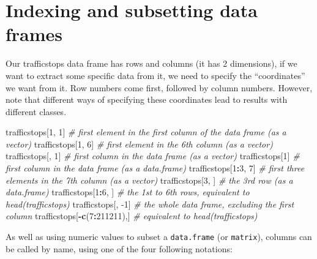 \documentclass[
]{book}
\newenvironment{Shaded}{\begin{snugshade}}{\end{snugshade}}
\newcommand{\CommentTok}[1]{\textcolor[rgb]{0.56,0.35,0.01}{\textit{#1}}}
\newcommand{\DecValTok}[1]{\textcolor[rgb]{0.00,0.00,0.81}{#1}}
\newcommand{\KeywordTok}[1]{\textcolor[rgb]{0.13,0.29,0.53}{\textbf{#1}}}
\newcommand{\NormalTok}[1]{#1}
\newcommand{\OperatorTok}[1]{\textcolor[rgb]{0.81,0.36,0.00}{\textbf{#1}}}
\newcommand{\StringTok}[1]{\textcolor[rgb]{0.31,0.60,0.02}{#1}}
\begin{document}
\hypertarget{indexing-and-subsetting-data-frames}{%
\section{Indexing and subsetting data frames}\label{indexing-and-subsetting-data-frames}}

Our trafficstops data frame has rows and columns (it has 2 dimensions), if we want to
extract some specific data from it, we need to specify the ``coordinates'' we
want from it. Row numbers come first, followed by column numbers. However, note
that different ways of specifying these coordinates lead to results with
different classes.

\begin{Shaded}
\begin{Highlighting}[]
\NormalTok{trafficstops[}\DecValTok{1}\NormalTok{, }\DecValTok{1}\NormalTok{]   }\CommentTok{# first element in the first column of the data frame (as a vector)}
\NormalTok{trafficstops[}\DecValTok{1}\NormalTok{, }\DecValTok{6}\NormalTok{]   }\CommentTok{# first element in the 6th column (as a vector)}
\NormalTok{trafficstops[, }\DecValTok{1}\NormalTok{]    }\CommentTok{# first column in the data frame (as a vector)}
\NormalTok{trafficstops[}\DecValTok{1}\NormalTok{]      }\CommentTok{# first column in the data frame (as a data.frame)}
\NormalTok{trafficstops[}\DecValTok{1}\OperatorTok{:}\DecValTok{3}\NormalTok{, }\DecValTok{7}\NormalTok{] }\CommentTok{# first three elements in the 7th column (as a vector)}
\NormalTok{trafficstops[}\DecValTok{3}\NormalTok{, ]    }\CommentTok{# the 3rd row (as a data.frame)}
\NormalTok{trafficstops[}\DecValTok{1}\OperatorTok{:}\DecValTok{6}\NormalTok{, ]  }\CommentTok{# the 1st to 6th rows, equivalent to head(trafficstops)}
\NormalTok{trafficstops[, }\DecValTok{-1}\NormalTok{]           }\CommentTok{# the whole data frame, excluding the first column}
\NormalTok{trafficstops[}\OperatorTok{-}\KeywordTok{c}\NormalTok{(}\DecValTok{7}\OperatorTok{:}\DecValTok{211211}\NormalTok{),]  }\CommentTok{# equivalent to head(trafficstops)}
\end{Highlighting}
\end{Shaded}

As well as using numeric values to subset a \texttt{data.frame} (or \texttt{matrix}), columns
can be called by name, using one of the four following notations:

\begin{Shaded}
\end{Shaded}
\end{document}

